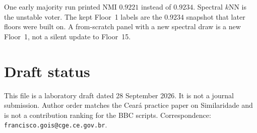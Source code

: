 \documentclass[11pt,a4paper]{article}
\begin{document}
One early majority run printed NMI $0.9221$ instead of
$0.9234$. Spectral $k$NN is the unstable voter. The kept
Floor~1 labels are the $0.9234$ snapshot that later floors
were built on. A from-scratch panel with a new spectral
draw is a new Floor~1, not a silent update to Floor~15.

\section{Draft status}

This file is a laboratory draft dated 28 September 2026. It
is not a journal submission. Author order matches the
Cear\'{a} practice paper on Similaridade and is not a
contribution ranking for the BBC scripts. Correspondence:
\texttt{francisco.gois@cge.ce.gov.br}.



\end{document}
